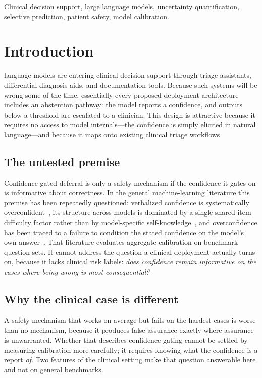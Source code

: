 \documentclass[journal,twoside]{IEEEtran}
\begin{document}
\begin{IEEEkeywords}
Clinical decision support, large language models, uncertainty quantification, selective prediction,
patient safety, model calibration.
\end{IEEEkeywords}

\section{Introduction}
 language models are entering clinical decision support through triage
assistants, differential-diagnosis aids, and documentation tools. Because such systems will be wrong
some of the time, essentially every proposed deployment architecture includes an abstention
pathway: the model reports a confidence, and outputs below a threshold are escalated to a
clinician. This design is attractive because it requires no access to model internals---the
confidence is simply elicited in natural language---and because it maps onto existing clinical
triage workflows.

\subsection{The untested premise}
Confidence-gated deferral is only a safety mechanism if the confidence it gates on is informative
about correctness. In the general machine-learning literature this premise has been repeatedly
questioned: verbalized confidence is systematically overconfident~\cite{xiong2023,kadavath2022},
its structure across models is dominated by a single shared item-difficulty factor rather than by
model-specific self-knowledge~\cite{metacog2026}, and overconfidence has been traced to a failure to
condition the stated confidence on the model's own answer~\cite{advice2025}. That literature
evaluates aggregate calibration on benchmark question sets. It cannot address the question a
clinical deployment actually turns on, because it lacks clinical risk labels: \emph{does confidence
remain informative on the cases where being wrong is most consequential?}

\subsection{Why the clinical case is different}
A safety mechanism that works on average but fails on the hardest cases is worse than no mechanism,
because it produces false assurance exactly where assurance is unwarranted. Whether that describes
confidence gating cannot be settled by measuring calibration more carefully; it requires knowing what
the confidence is a report \emph{of}. Two features of the clinical setting make that question
answerable here and not on general benchmarks.
\end{document}
